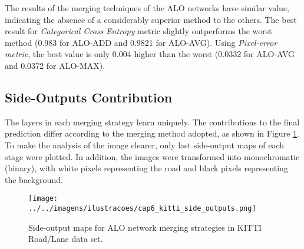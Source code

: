 % 

The results of the merging techniques of the ALO networks have similar value, indicating the absence of a considerably superior method to the others.
The best result for \textit{Categorical Cross Entropy} metric slightly outperforms the worst method (0.983 for ALO-ADD and 0.9821 for ALO-AVG).
Using \textit{Pixel-error metric}, the best value is only 0.004 higher than the worst (0.0332 for ALO-AVG and 0.0372 for ALO-MAX).

\subsection{Side-Outputs Contribution}
\label{cap6_contribuicoes_saidas_intermediarias}

The layers in each merging strategy learn uniquely.
The contributions to the final prediction differ according to the merging method adopted, as shown in Figure \ref{fig:kitti_side_outputs}.
To make the analysis of the image clearer, only last side-output maps of each stage were plotted.
In addition, the images were transformed into monochromatic (binary), with white pixels representing the road and black pixels representing the background.


\begin{figure}
  \centering
  \caption{Side-output maps for ALO network merging strategies in KITTI Road/Lane data set.}
  \texttt{[image: ../../imagens/ilustracoes/cap6\_kitti\_side\_outputs.png]}
  \sourceOwn
  \label{fig:kitti_side_outputs}
\end{figure}

